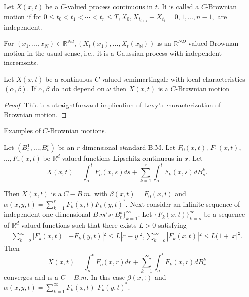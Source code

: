 \setcounter{definition}{3}
\begin{definition}\label{c2:def2.2.4}%
  Let $X(x, t)$ be a $C$-valued process continuous in $t$. It is
  called a $C$-Brownian motion if for $0 \leq t_0 < t_1 < \cdots < t_n
  \leq T, X_0, X_{t_{i+1}} - X_{t_i}= 0,1,\ldots, n-1,$ are
  independent. 
\end{definition} 
 
\setcounter{remark}{4}
\begin{remark}\label{c2:rem2.2.5}\pageoriginale%
  For $(x_1, \ldots, x_N) \in \mathbb{R}^{Nd},
  (X_t(x_1),\ldots, X_t(x_\mathbb{N}))$ is an $\mathbb{R}^{ND}$-valued
  Brownian motion in the usual sense, i.e.,  it is a Gaussian process
  with independent increments. 
\end{remark}  
 
\setcounter{proposition}{5}
\begin{proposition}\label{c2:prop2.2.6}%
  Let $X(x, t)$ be a continuous $C$-valued semimartingale with local
  characteristics  $(\alpha, \beta)$. If $\alpha, \beta$ do not depend
  on $\omega$ then $X(x, t)$ is a $C$-Brownian motion 
\end{proposition}  
 
\begin{proof}
  This is a straightforward implication of Levy's characterization of
  Brownian motion. 
\end{proof} 
 
\setcounter{example}{6}
\begin{example}\label{c2:exam2.2.7}%
  Examples of $C$-Brownian motions.
\end{example} 

 Let $(B^1_t,\ldots, B^r_t)$ be an $r$-dimensional standard B.M. Let
 $F_0 (x, t)$, $F_1(x, t)$, $\ldots,  F_r(x, t)$ be $\mathbb{R}^d$-valued
 functions Lipschitz continuous in $x$. Let 
\begin{equation*}
   X(x,t)= \int^t_o F_o(x,s)ds + \sum^{r}_{k=1}\int^t_o
   F_k(x,s)dB^k_s. \tag{2.2.1}\label{c2:eq2.2.1} 
\end{equation*} 

Then $X(x, t)$ is a $C-B.m$. with $\beta(x, t)=F_0(x,t)$ and $\alpha
(x,y,t) = \sum \limits^{r}_{k=1} F_k (x, t)F_k(y, t)^*$. 
 Next consider an infinite sequence of independent one-dimensional
 $B.m's\{B^k_t\}^\infty_{k=1}$. Let $\{ F_k(x,t)\}^\infty_{k=o}$ be a
 sequence of $\mathbb{R}^d$-valued functions such that there exists $L
 > 0$ satisfying 
 \begin{align*}
   \sum^{\infty}_{k=o}|F_k(x,t) &-F_k(y,t)|^2 \leq L|x-y|^2,
   \sum^{\infty}_{k=o}|F_k(x,t)|^2  \leq  L(1+|x|^2.
 \end{align*} 
 Then
 \begin{equation*}
   X(x,t)=\int^t_o F_o(x,r)dr+ \sum^\infty_{k=1}\int^t_o
   F_k(x,r)dB^k_r \tag{2.2.2}\label{c2:eq2.2.2} 
 \end{equation*} 
 converges and is a $C-B.m$. In this case $\beta(x, t)$ and $\alpha(x,
 y, t)= \sum \limits^{\infty}_{k=1} F_k(x,t)$ $F_k(y,t)^*$. 
 
